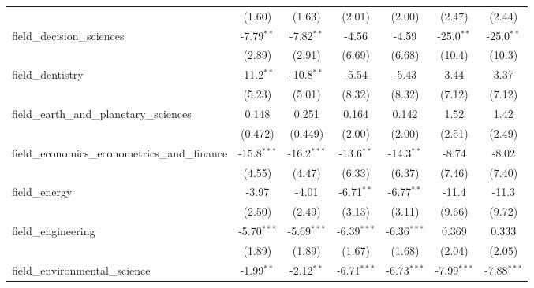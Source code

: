 \begin{tabular}{lcccccc}
                                                               & (1.60)        & (1.63)        & (2.01)        & (2.00)         & (2.47)        & (2.44)\\   
   field\_decision\_sciences                                   & -7.79$^{**}$  & -7.82$^{**}$  & -4.56         & -4.59          & -25.0$^{**}$  & -25.0$^{**}$\\   
                                                               & (2.89)        & (2.91)        & (6.69)        & (6.68)         & (10.4)        & (10.3)\\   
   field\_dentistry                                            & -11.2$^{**}$  & -10.8$^{**}$  & -5.54         & -5.43          & 3.44          & 3.37\\   
                                                               & (5.23)        & (5.01)        & (8.32)        & (8.32)         & (7.12)        & (7.12)\\   
   field\_earth\_and\_planetary\_sciences                      & 0.148         & 0.251         & 0.164         & 0.142          & 1.52          & 1.42\\   
                                                               & (0.472)       & (0.449)       & (2.00)        & (2.00)         & (2.51)        & (2.49)\\   
   field\_economics\_econometrics\_and\_finance                & -15.8$^{***}$ & -16.2$^{***}$ & -13.6$^{**}$  & -14.3$^{**}$   & -8.74         & -8.02\\   
                                                               & (4.55)        & (4.47)        & (6.33)        & (6.37)         & (7.46)        & (7.40)\\   
   field\_energy                                               & -3.97         & -4.01         & -6.71$^{**}$  & -6.77$^{**}$   & -11.4         & -11.3\\   
                                                               & (2.50)        & (2.49)        & (3.13)        & (3.11)         & (9.66)        & (9.72)\\   
   field\_engineering                                          & -5.70$^{***}$ & -5.69$^{***}$ & -6.39$^{***}$ & -6.36$^{***}$  & 0.369         & 0.333\\   
                                                               & (1.89)        & (1.89)        & (1.67)        & (1.68)         & (2.04)        & (2.05)\\   
   field\_environmental\_science                               & -1.99$^{**}$  & -2.12$^{**}$  & -6.71$^{***}$ & -6.73$^{***}$  & -7.99$^{***}$ & -7.88$^{***}$\\   

\end{tabular}
